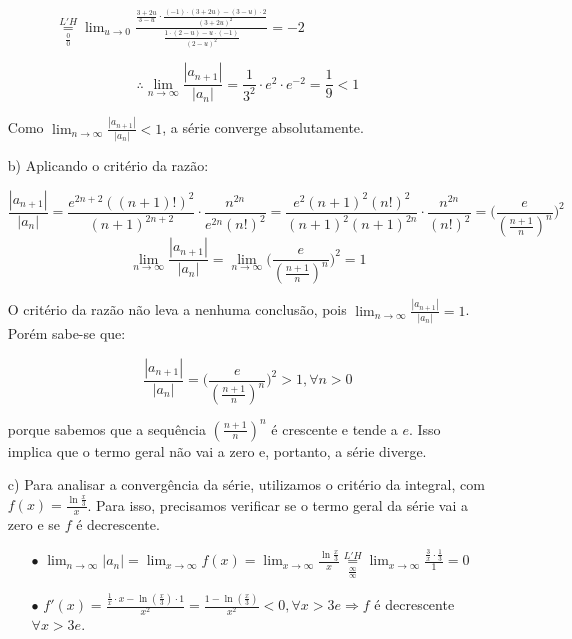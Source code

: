 \documentclass[12pt,a4paper]{article}
\begin{document}
\begin{itemize}
\begin{itemize}
\begin{itemize}
$\underset{\frac{0}{0}}{\overset{L'H}{=}} \displaystyle\lim_{u\rightarrow 0} \displaystyle \frac{\frac{3+2u}{3-u} \cdot \frac{(-1)\cdot(3+2u)-(3-u)\cdot 2}{(3+2u)^2}}{\frac{1\cdot(2-u)-u\cdot(-1)}{(2-u)^2}}= -2$
\end{itemize}
\end{itemize}

$$\therefore \lim_{n\rightarrow\infty} \frac{|a_{n+1}|}{|a_n|} = \frac{1}{3^2} \cdot e^2 \cdot e^{-2} = \frac{1}{9} < 1 $$

Como $\displaystyle\lim_{n\rightarrow\infty} \frac{|a_{n+1}|}{|a_n|} < 1$, a série converge absolutamente.

\item[b)] Aplicando o critério da razão:

$$ \frac{|a_{n+1}|}{|a_n|} =  \frac{e^{2n+2}((n+1)!)^2}{(n+1)^{2n+2}} \cdot  \frac{n^{2n}}{e^{2n} (n!)^2} =  \frac{e^{2}(n+1)^2 (n!)^2}{(n+1)^{2} (n+1)^{2n}} \cdot  \frac{n^{2n}}{ (n!)^2} = \Bigg( \frac{e}{(\frac{n+1}{n})^n} \Bigg)^2 $$
$$\lim_{n\rightarrow\infty} \frac{|a_{n+1}|}{|a_n|} = \lim_{n\rightarrow\infty} \Bigg( \frac{e}{(\frac{n+1}{n})^n} \Bigg)^2 = 1 $$

O critério da razão não leva a nenhuma conclusão, pois $\displaystyle\lim_{n\rightarrow\infty} \frac{|a_{n+1}|}{|a_n|} = 1 $. Porém sabe-se que:

$$ \frac{|a_{n+1}|}{|a_n|} = \Bigg( \frac{e}{(\frac{n+1}{n})^n} \Bigg)^2 > 1, \forall n > 0 $$

porque sabemos que a sequência $(\frac{n+1}{n})^n$ é crescente e tende a $e$. Isso implica que o termo geral não vai a zero e, portanto, a série diverge.

\item[c)] Para analisar a convergência da série, utilizamos o critério da integral, com $f(x) = \frac{\ln \frac{x}{3}}{x}$. Para isso, precisamos verificar se o termo geral da série vai a zero e se $f$ é decrescente.
    
    \begin{itemize}
    \item[$\bullet$] $\displaystyle\lim_{n \rightarrow \infty} |a_n| = \lim_{x \rightarrow \infty} f(x) = \lim_{x \rightarrow \infty} \frac{\ln \frac{x}{3}}{x} \underset{\frac{\infty}{\infty}}{ \overset{L'H}{=}} \lim_{x \rightarrow \infty} \frac{\frac{3}{x} \cdot \frac{1}{3}}{1} = 0$
    \item[$\bullet$] $f'(x) = \frac{\frac{1}{x} \cdot x - \ln(\frac{x}{3}) \cdot 1}{x^2} = \frac{1 - \ln(\frac{x}{3})}{x^2} < 0, \forall x > 3e  \Rightarrow f$ é decrescente $\forall x > 3e$.
    \end{itemize}
    

\end{itemize}
\end{document}
